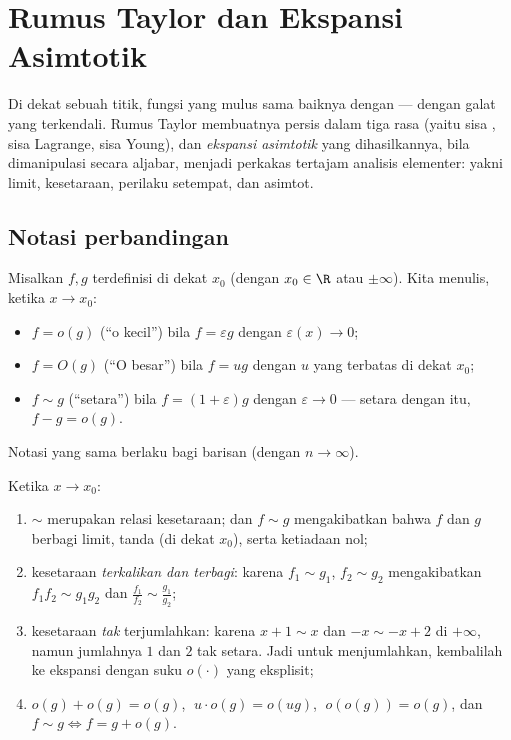 \chapter{Rumus Taylor dan Ekspansi Asimtotik}\label{ch:b1:taylor}

Di dekat sebuah titik, fungsi yang mulus sama baiknya dengan  --- dengan
galat yang terkendali. Rumus Taylor membuatnya persis dalam tiga
rasa (yaitu sisa , sisa Lagrange, sisa Young),
dan \emph{ekspansi asimtotik} yang dihasilkannya, bila dimanipulasi
secara aljabar, menjadi perkakas tertajam analisis elementer:
yakni limit, kesetaraan, perilaku setempat, dan asimtot.

\section{Notasi perbandingan}

\begin{definition}\label{def:b1:taylor:landau}
Misalkan $f, g$ terdefinisi di dekat $x_0$ (dengan $x_0 \in \R$ atau $\pm\infty$). Kita
menulis, ketika $x \to x_0$:
\begin{itemize}
  \item $f = o(g)$ (``o kecil'') bila $f = \varepsilon g$ dengan
        $\varepsilon(x) \to 0$;
  \item $f = O(g)$ (``O besar'') bila $f = u g$ dengan $u$ yang terbatas di dekat
        $x_0$;
  \item $f \sim g$ (``setara'') bila
        $f = (1 + \varepsilon) g$ dengan $\varepsilon \to 0$ ---
        setara dengan itu, $f - g = o(g)$.
\end{itemize}
Notasi yang sama berlaku bagi barisan (dengan $n \to \infty$).
\end{definition}

\begin{proposition}[Aturannya]\label{prop:b1:taylor:landaurules}
Ketika $x \to x_0$:
\begin{enumerate}
  \item $\sim$ merupakan relasi kesetaraan; dan $f \sim g$ mengakibatkan bahwa
        $f$ dan $g$ berbagi limit, tanda (di dekat $x_0$), serta ketiadaan
        nol;
  \item kesetaraan \emph{terkalikan dan terbagi}: karena $f_1 \sim g_1$, $f_2
        \sim g_2$ mengakibatkan $f_1 f_2 \sim g_1 g_2$ dan $\frac{f_1}{f_2}
        \sim \frac{g_1}{g_2}$;
  \item kesetaraan \emph{tak} terjumlahkan: karena $x + 1 \sim x$ dan $-x \sim
        -x + 2$ di $+\infty$, namun jumlahnya $1$ dan $2$ tak
        setara. Jadi untuk menjumlahkan, kembalilah ke ekspansi dengan suku
        $o(\cdot)$ yang eksplisit;
  \item $o(g) + o(g) = o(g)$, $\;u \cdot o(g) = o(ug)$, $\;o(o(g)) =
        o(g)$, dan $f \sim g \iff f = g + o(g)$.
\end{enumerate}
\end{proposition}


